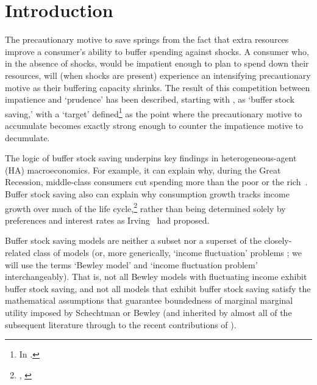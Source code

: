 \documentclass[BufferStockTheory]{subfiles}
\begin{document}
  \medskip\medskip
  \begin{minipage}{0.9\textwidth}
    \listoftables
  \end{minipage}

\hypersetup{pageanchor=true}  %

\pagebreak
\hypertarget{Introduction}{}
\section{Introduction}\label{sec:intro}
\setcounter{page}{0}

The precautionary motive to save springs from the fact that extra resources improve a consumer's ability to buffer spending against shocks.
A consumer who, in the absence of shocks, would be impatient enough to plan to spend down their resources, will (when shocks are present) experience an intensifying precautionary motive as their buffering capacity shrinks.
The result of this competition between impatience and `prudence' \citep{kimball:smallandlarge} has been described, starting with \cite{deatonLiqConstr}, as `buffer stock saving,' with a `target' defined\footnote{In \cite{carroll:brookings}.} as the point where the precautionary motive to accumulate becomes exactly strong enough to counter the impatience motive to decumulate.

The logic of buffer stock saving underpins key findings in heterogeneous-agent (HA) macroeconomics.
For example, it can explain why, during the Great Recession, middle-class consumers cut spending more than the poor or the rich~\citep{kmpHandbook}.
Buffer stock saving also can explain why consumption growth tracks income growth over much of the life cycle,\footnote{\cite{carrollBSLCPIH}, \cite{gpLifeCycle}} rather than being determined solely by preferences and interest rates as Irving~\cite{fisherInterestTheory} had proposed.

Buffer stock saving models are neither a subset nor a superset of the closely-related class of \cite{bewleyPIH} models (or, more generically, `income fluctuation' problems  \citep{schectman:fluctuation}; we will use the terms `Bewley model' and `income fluctuation problem' interchangeably).
That is, not all Bewley models with fluctuating income exhibit buffer stock saving, and not all models that exhibit buffer stock saving satisfy the mathematical assumptions that guarantee boundedness of marginal marginal utility imposed by Schechtman or Bewley (and inherited by almost all of the subsequent literature through to the recent contributions of \cite{mstIncFluct,maUnboundedDP}). 
\end{document}
